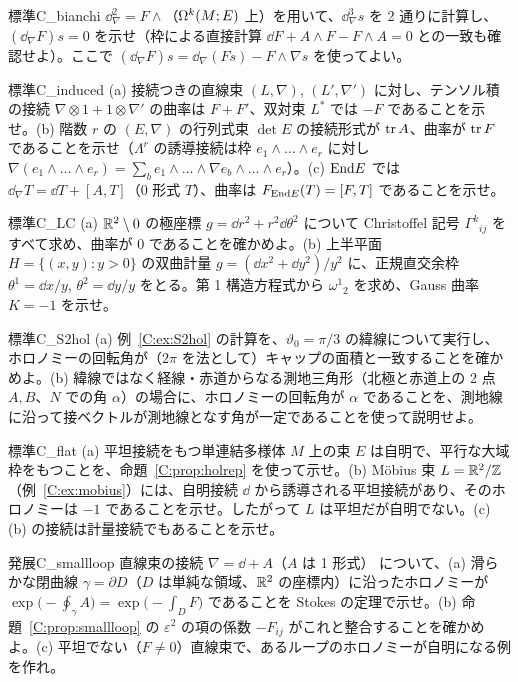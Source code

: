 \begin{probl}{標準}{C_bianchi}
$\dd_\nabla^2=F\wedge$（$\Omega^k(M;E)$ 上）を用いて、$\dd_\nabla^3s$ を 2 通りに計算し、$(\dd_\nabla F)s=0$ を示せ（枠による直接計算 $\dd F+A\wedge F-F\wedge A=0$ との一致も確認せよ）。ここで $(\dd_\nabla F)s=\dd_\nabla(Fs)-F\wedge\nabla s$ を使ってよい。
\end{probl}
\begin{probl}{標準}{C_induced}
(a) 接続つきの直線束 $(L,\nabla)$, $(L',\nabla')$ に対し、テンソル積の接続 $\nabla\otimes1+1\otimes\nabla'$ の曲率は $F+F'$、双対束 $L^*$ では $-F$ であることを示せ。(b) 階数 $r$ の $(E,\nabla)$ の行列式束 $\det E$ の接続形式が $\operatorname{tr} A$、曲率が $\operatorname{tr} F$ であることを示せ（$\Lambda^r$ の誘導接続は枠 $e_1\wedge\dots\wedge e_r$ に対し $\nabla(e_1\wedge\dots\wedge e_r)=\sum_be_1\wedge\dots\wedge\nabla e_b\wedge\dots\wedge e_r$）。(c) $\mathrm{End} E$ では $\dd_\nabla T=\dd T+[A,T]$（0 形式 $T$）、曲率は $F_{\mathrm{End} E}(T)=[F,T]$ であることを示せ。
\end{probl}
\begin{probl}{標準}{C_LC}
(a) $\mathbb R^2\setminus0$ の極座標 $g=\dd r^2+r^2\dd\theta^2$ について Christoffel 記号 $\Gamma^k{}_{ij}$ をすべて求め、曲率が $0$ であることを確かめよ。(b) 上半平面 $H=\{(x,y):y>0\}$ の双曲計量 $g=(\dd x^2+\dd y^2)/y^2$ に、正規直交余枠 $\theta^1=\dd x/y$, $\theta^2=\dd y/y$ をとる。第 1 構造方程式から $\omega^1{}_2$ を求め、Gauss 曲率 $K=-1$ を示せ。
\end{probl}
\begin{probl}{標準}{C_S2hol}
(a) 例~\ref{C:ex:S2hol} の計算を、$\vartheta_0=\pi/3$ の緯線について実行し、ホロノミーの回転角が（$2\pi$ を法として）キャップの面積と一致することを確かめよ。(b) 緯線ではなく経線・赤道からなる測地三角形（北極と赤道上の 2 点 $A,B$、$N$ での角 $\alpha$）の場合に、ホロノミーの回転角が $\alpha$ であることを、測地線に沿って接ベクトルが測地線となす角が一定であることを使って説明せよ。
\end{probl}
\begin{probl}{標準}{C_flat}
(a) 平坦接続をもつ単連結多様体 $M$ 上の束 $E$ は自明で、平行な大域枠をもつことを、命題~\ref{C:prop:holrep} を使って示せ。(b) Möbius 束 $L=\mathbb R^2/\mathbb Z$（例~\ref{C:ex:mobius}）には、自明接続 $\dd$ から誘導される平坦接続があり、そのホロノミーは $-1$ であることを示せ。したがって $L$ は平坦だが自明でない。(c) (b) の接続は計量接続でもあることを示せ。
\end{probl}
\begin{probl}{発展}{C_smallloop}
直線束の接続 $\nabla=\dd+A$（$A$ は 1 形式） について、(a) 滑らかな閉曲線 $\gamma=\partial D$（$D$ は単純な領域、$\mathbb R^2$ の座標内）に沿ったホロノミーが $\exp\bigl(-\oint_\gamma A\bigr)=\exp\bigl(-\int_DF\bigr)$ であることを Stokes の定理で示せ。(b) 命題~\ref{C:prop:smallloop} の $\varepsilon^2$ の項の係数 $-F_{ij}$ がこれと整合することを確かめよ。(c) 平坦でない（$F\ne0$）直線束で、あるループのホロノミーが自明になる例を作れ。
\end{probl}

